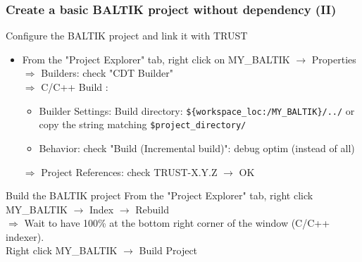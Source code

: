 \documentclass[10pt, hyperref={unicode=true,pdfusetitle, bookmarks=true,bookmarksnumbered=false,bookmarksopen=false, breaklinks=false,pdfborder={0 0 1},backref=true,colorlinks=true,linkcolor=darkblue,pageanchor, urlcolor=darkblue}]{beamer}
\begin{document}
\begin{frame}
\frametitle{Create a basic BALTIK project without dependency (II)}

\begin{block}{Configure the BALTIK project and link it with TRUST}
\begin{itemize}
\item From the "Project Explorer" tab, right click on MY\_BALTIK $\rightarrow$ Properties \\
  $\Rightarrow$ Builders: check "CDT Builder" \\
  $\Rightarrow$ C/C++ Build : 
  \begin{itemize}
  \item Builder Settings: Build directory: \texttt{\$\{workspace\_loc:/MY\_BALTIK\}/../} or copy the string matching \texttt{\$project\_directory/} \\
  \item Behavior: check "Build (Incremental build)": debug optim (instead of all) 
  \end{itemize}
  $\Rightarrow$ Project References: check TRUST-X.Y.Z $\rightarrow$ OK
\end{itemize}
\end{block}
  
\begin{block}{Build the BALTIK project}
From the "Project Explorer" tab, right click MY\_BALTIK $\rightarrow$ Index $\rightarrow$ Rebuild \\
  $\Rightarrow$ Wait to have 100\% at the bottom right corner of the window  (C/C++ indexer). \\
  Right click MY\_BALTIK $\rightarrow$ Build Project \\
\end{block}

\end{frame}
\end{document}
